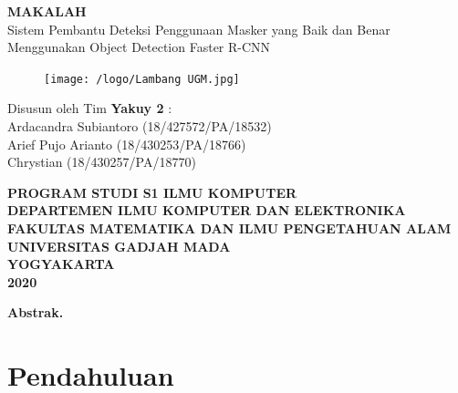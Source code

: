 \documentclass{article}
\begin{document}
  \begin{titlepage}
    \begin{center}
      
      \null
      {
      	\LARGE \bfseries MAKALAH}\\
      [0.5cm]
      {\Large Sistem Pembantu Deteksi Penggunaan Masker yang Baik dan Benar Menggunakan Object Detection Faster R-CNN}\\
          
      \vspace{2cm}

      \begin{figure}[H]
        \centering
        \texttt{[image: /logo/Lambang UGM.jpg]}
      \end{figure}
          
      \vspace{3cm}
    
      {\Large 
      Disusun oleh Tim \bfseries Yakuy 2} {\Large :\\
      \vspace{0.5cm}
      Ardacandra Subiantoro (18/427572/PA/18532)\\
      Arief Pujo Arianto (18/430253/PA/18766)\\
      Chrystian (18/430257/PA/18770)\\
      }


      \vspace{2cm}

      {\normalsize \bfseries
      PROGRAM STUDI S1 ILMU KOMPUTER\\
      DEPARTEMEN ILMU KOMPUTER DAN ELEKTRONIKA\\
      FAKULTAS MATEMATIKA DAN ILMU PENGETAHUAN ALAM\\
      UNIVERSITAS GADJAH MADA\\
      YOGYAKARTA\\
      \vspace{0.2cm}
      2020
      }
            
    \end{center}
  \end{titlepage}


  \newpage
  \textbf{Abstrak.} 
  \newpage
  \tableofcontents
  \newpage
  \section{Pendahuluan}
\end{document}
